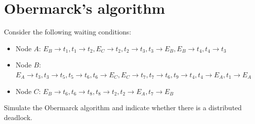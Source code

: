 \section{Obermarck's algorithm}

Consider the following waiting conditions:
\begin{itemize}
    \item Node $A$: $E_B \rightarrow t_1, t_1 \rightarrow t_2, E_C \rightarrow t_2, t_2 \rightarrow t_3, t_3 \rightarrow E_B, E_B \rightarrow t_4, t_4 \rightarrow t_3$
    \item Node $B$: $E_A \rightarrow t_3, t_3 \rightarrow t_5, t_5 \rightarrow t_6, t_6 \rightarrow E_C, E_C \rightarrow t_7, t_7 \rightarrow t_6, t_9 \rightarrow t_4,t_4 \rightarrow E_A, t_1 \rightarrow E_A$
    \item Node $C$: $E_B \rightarrow t_6, t_6 \rightarrow t_8, t_8 \rightarrow t_2, t_2 \rightarrow E_A, t_7 \rightarrow E_B$
\end{itemize}
Simulate the Obermarck algorithm and indicate whether there is a distributed deadlock.
    

